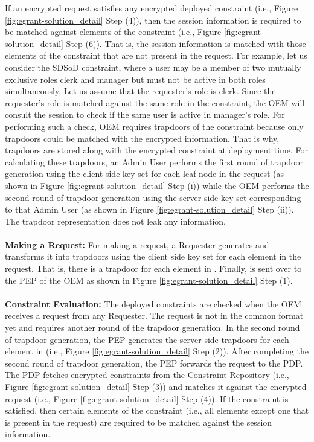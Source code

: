 \documentclass[epsfig,a4paper,11pt,titlepage]{book}
\numberwithin{algorithm}{chapter}
\begin{document}
If an encrypted request satisfies any encrypted deployed constraint (i.e., Figure \ref{fig:egrant-solution_detail} Step (4)), then the session information is required to be matched against elements of the constraint (i.e., Figure \ref{fig:egrant-solution_detail} Step (6)). That is, the session information is matched with those elements of the constraint that are not present in the request. For example, let us consider the S\gls{DSoD} constraint, where a user may be a member of two mutually exclusive roles clerk and manager but must not be active in both roles simultaneously. Let us assume that the requester's role is clerk. Since the requester's role is matched against the same role in the constraint, the \gls{OEM} will consult the session to check if the same user is active in manager's role. For performing such a check, \gls{OEM} requires trapdoors of the constraint because only trapdoors could be matched with the encrypted information. That is why, trapdoors are stored along with the encrypted constraint at deployment time. For calculating these trapdoors, an Admin User performs the first round of trapdoor generation using the client side key set for each leaf node in the request (as shown in Figure \ref{fig:egrant-solution_detail} Step (i)) while the \gls{OEM} performs the second round of trapdoor generation using the server side key set corresponding to that Admin User (as shown in Figure \ref{fig:egrant-solution_detail} Step (ii)). The trapdoor representation does not leak any information.  \\ \\
\noindent \textbf{Making a Request:} For making a request, a Requester generates  and transforms it into trapdoors using the client side key set for each element in the request. That is, there is a trapdoor for each element in . Finally,  is sent over to the \gls{PEP} of the \gls{OEM} as shown in Figure \ref{fig:egrant-solution_detail} Step (1). \\ \\
\noindent \textbf{Constraint Evaluation:} The deployed constraints are checked when the \gls{OEM} receives a request from any Requester. The request is not in the common format yet and requires another round of the trapdoor generation. In the second round of trapdoor generation, the \gls{PEP} generates the server side trapdoors for each element in  (i.e., Figure \ref{fig:egrant-solution_detail} Step (2)). After completing the second round of trapdoor generation, the \gls{PEP} forwards the request to the \gls{PDP}. The \gls{PDP} fetches encrypted constraints from the Constraint Repository (i.e., Figure \ref{fig:egrant-solution_detail} Step (3)) and matches it against the encrypted request (i.e., Figure \ref{fig:egrant-solution_detail} Step (4)). If the constraint is satisfied, then certain elements of the constraint (i.e., all elements except one that is present in the request) are required to be matched against the session information. \\ \\
\end{document}
